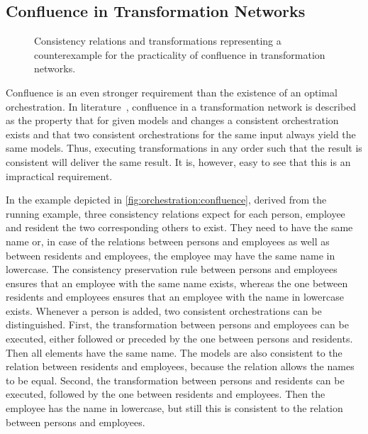 \subsection{Confluence in Transformation Networks}
\label{chap:orchestration:decidability:confluence}

\begin{figure}
    \centering
    
    \caption[Confluence of transformations counterexample]{Consistency relations and transformations representing a counterexample for the practicality of confluence in transformation networks.}
    \label{fig:orchestration:confluence}
\end{figure}

Confluence is an even stronger requirement than the existence of an optimal orchestration.
In literature~\cite{stevens2020BidirectionalTransformationLarge-SoSym}, confluence in a transformation network is described as the property that for given models and changes a consistent orchestration exists and that two consistent orchestrations for the same input always yield the same models.
Thus, executing transformations in any order such that the result is consistent will deliver the same result.
It is, however, easy to see that this is an impractical requirement.

In the example depicted in \autoref{fig:orchestration:confluence}, derived from the running example, three consistency relations expect for each person, employee and resident the two corresponding others to exist.
They need to have the same name or, in case of the relations between persons and employees as well as between residents and employees, the employee may have the same name in lowercase.
The consistency preservation rule between persons and employees ensures that an employee with the same name exists, whereas the one between residents and employees ensures that an employee with the name in lowercase exists.
Whenever a person is added, two consistent orchestrations can be distinguished.
First, the transformation between persons and employees can be executed, either followed or preceded by the one between persons and residents. Then all elements have the same name.
The models are also consistent to the relation between residents and employees, because the relation allows the names to be equal.
Second, the transformation between persons and residents can be executed, followed by the one between residents and employees.
Then the employee has the name in lowercase, but still this is consistent to the relation between persons and employees.

